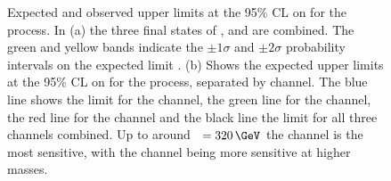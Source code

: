 \begin{figure}[h!]
\begin{center}
\caption[Expected and observed upper limits at the 95\% CL on 
\xsbr for the \Htohhtobbtautau process.]{Expected and observed upper limits at the 95\% \ac{CL} on \xsbr  
for the \mbox{\Htohhtobbtautau} process. In (a) the three final states of \etau, \mutau and \tautau are combined. The green and yellow bands indicate the $\pm 1 \sigma $ and $\pm 2\sigma$ 
probability intervals on the expected limit  \cite{CMS-HIG-14-034}.
(b) Shows the expected upper limits at the 95\% \ac{CL} on \xsbr for the \Htohhtobbtautau
process, separated by channel. The blue line shows the limit for the \tautau channel, the green line for the \mutau channel, the red line
for the \etau channel and the black line the limit for all three channels combined. Up to around \mH~$= 320\,\GeV$ the \mutau channel is the most
sensitive, with the \tautau channel being more sensitive at higher masses.}
\label{fig:hhh_results_modelindep}
\end{center}
\end{figure}
\clearpage


